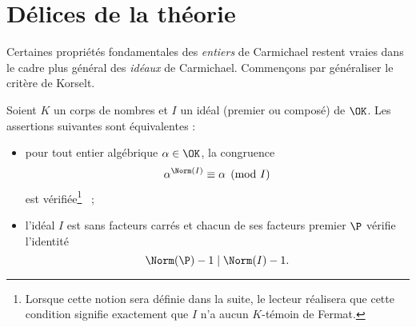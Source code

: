 \section{Délices de la théorie}

Certaines propriétés fondamentales des \emph{entiers} de Carmichael restent vraies dans le cadre plus général des \emph{idéaux} de Carmichael. Commençons par généraliser le critère de Korselt.

\begin{theoreme}\label{korselt-generalise}
	Soient $K$ un corps de nombres et $I$ un idéal (premier ou composé) de $\OK$. Les assertions suivantes sont équivalentes :
	\begin{itemize}
		\item pour tout entier algébrique $\alpha \in \OK$, la congruence \[\alpha^{\Norm(I)} \equiv \alpha \pmod{I}\] est vérifiée\footnote{Lorsque cette notion sera définie dans la suite, le lecteur réalisera que cette condition signifie exactement que $I$ n'a aucun $K$-témoin de Fermat.} ~;
		\item l'idéal $I$ est sans facteurs carrés et chacun de ses facteurs premier $\P$ vérifie l'identité \[\Norm(\P) - 1 \mid \Norm(I) - 1.\]
	\end{itemize}
\end{theoreme}

